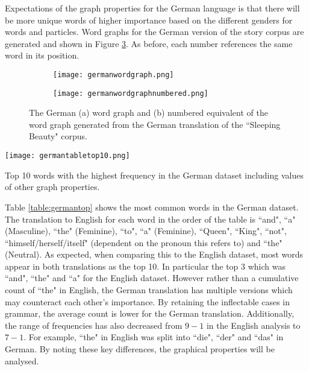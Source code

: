Expectations of the graph properties for the German language is that there will be more unique words of higher importance based on the different genders for words and particles. Word graphs for the German version of the story corpus are generated and shown in Figure \ref{fig:gergraph}. As before, each number references the same word in its position.

\begin{figure}[!htb]
\centering
\begin{subfigure}{.45\textwidth}
	\texttt{[image: germanwordgraph.png]}
	\caption{}
	\label{fig:gerword}
\end{subfigure}
\hfill
\begin{subfigure}{.45\textwidth}
	\hspace{-2cm} 
	\texttt{[image: germanwordgraphnumbered.png]}
	\caption{}
	\label{fig:gernum}
\end{subfigure}
\caption{The German (a) word graph and (b) numbered equivalent of the word graph generated from the German translation of the ``Sleeping Beauty" corpus.}
\label{fig:gergraph}
\end{figure}

\begin{table}[!htb]
\centering
\texttt{[image: germantabletop10.png]}
\caption{Top 10 words with the highest frequency in the German dataset including values of other graph properties. }
\label{table:germantop}
\end{table}

Table \ref{table:germantop} shows the most common words in the German dataset. The translation to English for each word in the order of the table is ``and", ``a" (Masculine), ``the" (Feminine), ``to", ``a" (Feminine), ``Queen", ``King", ``not", ``himself/herself/itself" (dependent on the pronoun this refers to) and ``the" (Neutral). As expected, when comparing this to the English dataset, most words appear in both translations as the top 10. In particular the top 3 which was ``and", ``the" and ``a" for the English dataset. However rather than a cumulative count of ``the" in English, the German translation has multiple versions which may counteract each other's importance. By retaining the inflectable cases in grammar, the average count is lower for the German translation. Additionally, the range of frequencies has also decreased from $9-1$ in the English analysis to $7-1$. For example, ``the" in English was split into ``die", ``der" and ``das" in German. By noting these key differences, the graphical properties will be analysed.

